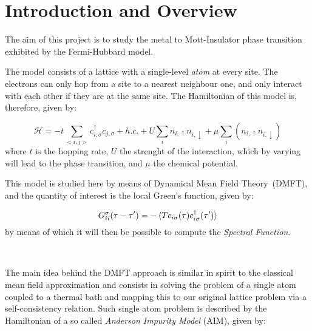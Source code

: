 
\section{Introduction and Overview}
The aim of this project is to study the metal to Mott-Insulator phase transition exhibited by the Fermi-Hubbard model.

The model consists of a lattice with a single-level \textit{atom} at every site. The electrons can only hop from a site to a nearest neighbour one, and only interact with each other if they are at the same site. The Hamiltonian of this model is, therefore, given by:

\begin{equation}
\mathcal{H} = -t\sum_{<i,j>}c_{i,\sigma}^\dagger c_{j,\sigma} + h.c.+ U\sum_i n_{i,\uparrow}n_{i,\downarrow} + \mu\sum_i (n_{i,\uparrow}n_{i,\downarrow})
\end{equation}
where $t$ is the hopping rate, $U$ the strenght of the interaction, which by varying will lead to the phase transition, and $\mu$ the chemical potential.




This model is studied here by means of Dynamical Mean Field Theory~(DMFT), and the quantity of interest is the local Green's function, given by:

\begin{equation}\label{orGreen's}
G_{ii}^\sigma (\tau - \tau^\prime) = -\braket{Tc_{i\sigma}(\tau)c_{i\sigma}^\dagger(\tau^\prime)} 
\end{equation}
by means of which it will then be possible to compute the \emph{Spectral Function}.

~

The main idea behind the DMFT approach is similar in spirit to the classical mean field approximation and consists in solving the problem of a single atom coupled to a thermal bath and mapping this to our original lattice problem via a self-consistency relation.
Such single atom problem is described by the Hamiltonian of a so called \emph{Anderson Impurity Model} (AIM), given by:

